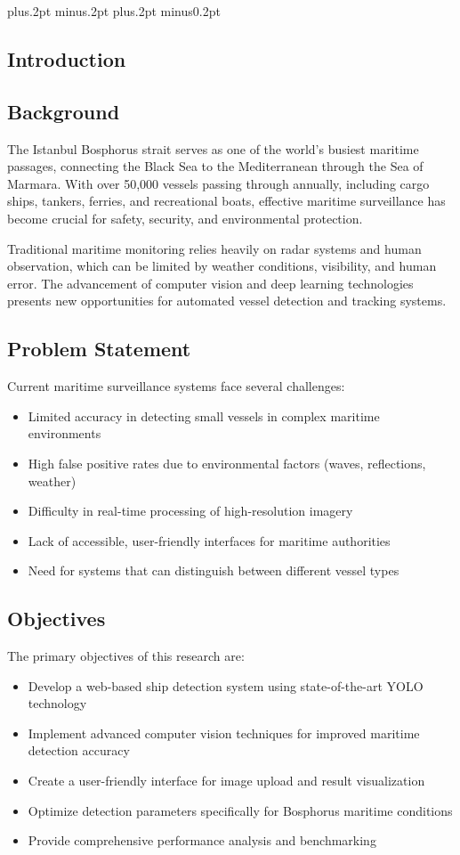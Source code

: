 \documentclass[twoside]{article}
\begin{document}
\baselineskip=18pt plus.2pt minus.2pt
\parskip=0pt plus.2pt minus0.2pt
\begin{multicols}{2}

\section{Introduction}

\subsection{Background}
The Istanbul Bosphorus strait serves as one of the world's busiest maritime passages, connecting the Black Sea to the Mediterranean through the Sea of Marmara. With over 50,000 vessels passing through annually, including cargo ships, tankers, ferries, and recreational boats, effective maritime surveillance has become crucial for safety, security, and environmental protection.

Traditional maritime monitoring relies heavily on radar systems and human observation, which can be limited by weather conditions, visibility, and human error. The advancement of computer vision and deep learning technologies presents new opportunities for automated vessel detection and tracking systems.

\subsection{Problem Statement}
Current maritime surveillance systems face several challenges:
\begin{itemize}
    \item Limited accuracy in detecting small vessels in complex maritime environments
    \item High false positive rates due to environmental factors (waves, reflections, weather)
    \item Difficulty in real-time processing of high-resolution imagery
    \item Lack of accessible, user-friendly interfaces for maritime authorities
    \item Need for systems that can distinguish between different vessel types
\end{itemize}

\subsection{Objectives}
The primary objectives of this research are:
\begin{itemize}
    \item Develop a web-based ship detection system using state-of-the-art YOLO technology
    \item Implement advanced computer vision techniques for improved maritime detection accuracy
    \item Create a user-friendly interface for image upload and result visualization
    \item Optimize detection parameters specifically for Bosphorus maritime conditions
    \item Provide comprehensive performance analysis and benchmarking
\end{itemize}


\end{multicols}
\end{document}
